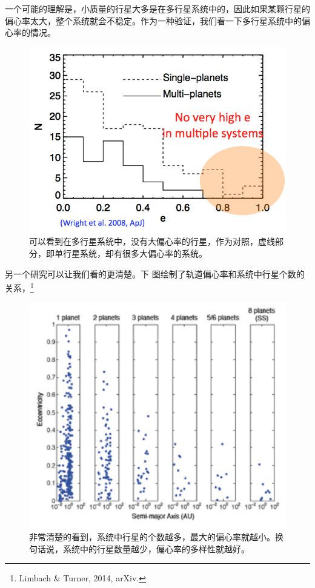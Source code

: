 \documentclass[letterpaper,10pt,english]{sphinxmanual}
\begin{document}
一个可能的理解是，小质量的行星大多是在多行星系统中的，因此如果某颗行星的偏心率太大，整个系统就会不稳定。作为一种验证，我们看一下多行星系统中的偏心率的情况。
\begin{figure}[htbp]
\centering
\capstart

\includegraphics{multiVSe.png}
\caption{可以看到在多行星系统中，没有大偏心率的行星，作为对照，虚线部分，即单行星系统，却有很多大偏心率的系统。}\end{figure}

另一个研究可以让我们看的更清楚。下 图绘制了轨道偏心率和系统中行星个数的关系，\footnote{
Limbach \& Turner, 2014, arXiv.
}
\begin{figure}[htbp]
\centering
\capstart

\includegraphics{eVSmulti.png}
\caption{非常清楚的看到，系统中行星的个数越多，最大的偏心率就越小。换句话说，系统中的行星数量越少，偏心率的多样性就越好。}\end{figure}
\end{document}
